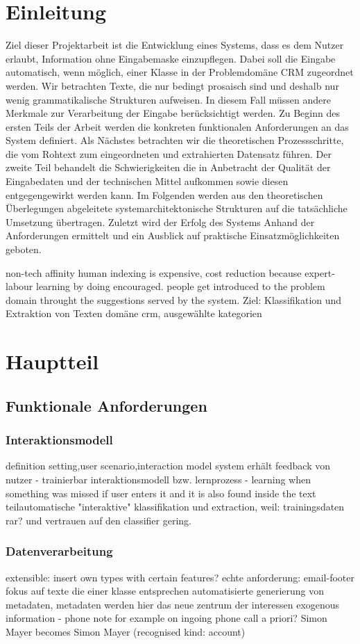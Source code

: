 \chapter{Einleitung}
Ziel dieser Projektarbeit ist die Entwicklung eines Systems, dass es dem Nutzer erlaubt, Information ohne Eingabemaske einzupflegen. Dabei soll die Eingabe automatisch, wenn möglich, einer Klasse in der Problemdomäne CRM zugeordnet werden. Wir betrachten Texte, die nur bedingt prosaisch sind und deshalb nur wenig grammatikalische Strukturen aufweisen. In diesem Fall müssen andere Merkmale zur Verarbeitung der Eingabe berücksichtigt werden.
Zu Beginn des ersten Teils der Arbeit werden die konkreten funktionalen Anforderungen an das System definiert. Als Nächstes betrachten wir die theoretischen Prozessschritte, die vom Rohtext zum eingeordneten und extrahierten Datensatz führen. Der zweite Teil behandelt die Schwierigkeiten die in Anbetracht der Qualität der Eingabedaten und der technischen Mittel aufkommen sowie diesen entgegengewirkt werden kann. Im Folgenden werden aus den theoretischen Überlegungen abgeleitete systemarchitektonische Strukturen auf die tatsächliche Umsetzung übertragen.
Zuletzt wird der Erfolg des Systems Anhand der Anforderungen ermittelt und ein Ausblick auf praktische Einsatzmöglichkeiten geboten.

non-tech affinity \cite{hemken}
human indexing is expensive, cost reduction because expert-labour
learning by doing encouraged. people get introduced to the problem domain throught the suggestions served by the system.
Ziel: Klassifikation und Extraktion von Texten
domäne crm, ausgewählte kategorien
\chapter{Hauptteil}
\section{Funktionale Anforderungen}
\subsection{Interaktionsmodell}
definition setting,user scenario,interaction model
system erhält feedback von nutzer - trainierbar
interaktionsmodell bzw. lernprozess - learning when something was missed if user enters it and it is also found inside the text
teilautomatische "interaktive" klassifikation und extraction, weil: trainingsdaten rar? und vertrauen auf den classifier gering.
\subsection{Datenverarbeitung}
extensible: insert own types with certain features?
echte anforderung: email-footer
fokus auf texte die einer klasse entsprechen
automatisierte generierung von metadaten, metadaten werden hier das neue zentrum der interessen
exogenous information - phone note for example on ingoing phone call
a priori?
Simon Mayer becomes Simon Mayer (recognised kind: account)

